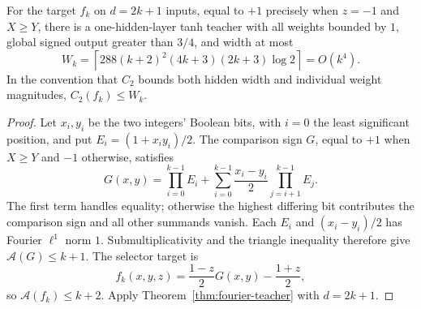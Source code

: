\begin{corollary}
\label{cor:selector-teacher}
For the target $f_k$ on $d=2k+1$ inputs, equal to $+1$ precisely when
$z=-1$ and $X\ge Y$, there is a one-hidden-layer tanh teacher with all
weights bounded by $1$, global signed output greater than $3/4$, and
width at most
\begin{equation}\label{eq:selector-teacher-width}
 W_k=\left\lceil
 288(k+2)^2(4k+3)(2k+3)\log2
 \right\rceil=O(k^4).
\end{equation}
In the convention that $C_2$ bounds both hidden width and individual
weight magnitudes, $C_2(f_k)\le W_k$.
\end{corollary}
\begin{proof}
Let $x_i,y_i$ be the two integers' Boolean bits, with $i=0$ the least
significant position, and put $E_i=(1+x_i y_i)/2$.  The comparison sign
$G$, equal to $+1$ when $X\ge Y$ and $-1$ otherwise, satisfies
\[
 G(x,y)=\prod_{i=0}^{k-1}E_i
   +\sum_{i=0}^{k-1}\frac{x_i-y_i}{2}
       \prod_{j=i+1}^{k-1}E_j.
\]
The first term handles equality; otherwise the highest differing bit
contributes the comparison sign and all other summands vanish.
Each $E_i$ and $(x_i-y_i)/2$ has Fourier $\ell^1$ norm $1$.
Submultiplicativity and the triangle inequality therefore give
$\mathcal A(G)\le k+1$.  The selector target is
\[
 f_k(x,y,z)=\frac{1-z}{2}G(x,y)-\frac{1+z}{2},
\]
so $\mathcal A(f_k)\le k+2$.  Apply
Theorem~\ref{thm:fourier-teacher} with $d=2k+1$.
\end{proof}
